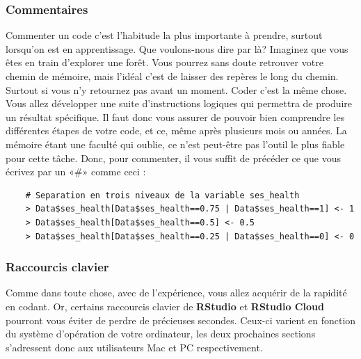 \documentclass[10.5pt,a4paper]{article}
\begin{document}
    \subsubsection{Commentaires}
    
    Commenter un code c'est l'habitude la plus importante à prendre, surtout lorsqu'on est en apprentissage. Que voulons-nous dire par là? Imaginez que vous êtes en train d'explorer une forêt. Vous pourrez sans doute retrouver votre chemin de mémoire, mais l'idéal c'est de laisser des repères le long du chemin. Surtout si vous n'y retournez pas avant un moment. Coder c'est la même chose. Vous allez développer une suite d'instructions logiques qui permettra de produire un résultat spécifique. Il faut donc vous assurer de pouvoir bien comprendre les différentes étapes de votre code, et ce, même après plusieurs mois ou années. La mémoire étant une faculté qui oublie, ce n'est peut-être pas l'outil le plus fiable pour cette tâche. Donc, pour commenter, il vous suffit de précéder ce que vous écrivez par un «$\#$» comme ceci :
    
    \begin{lstlisting}
    # Separation en trois niveaux de la variable ses_health
    > Data$ses_health[Data$ses_health==0.75 | Data$ses_health==1] <- 1 
    > Data$ses_health[Data$ses_health==0.5] <- 0.5
    > Data$ses_health[Data$ses_health==0.25 | Data$ses_health==0] <- 0
    \end{lstlisting}
    
    \subsubsection{Raccourcis clavier}
    
    Comme dans toute chose, avec de l'expérience, vous allez acquérir de la rapidité en codant. Or, certains raccourcis clavier de \textbf{RStudio} et \textbf{RStudio Cloud} pourront vous éviter de perdre de précieuses secondes. Ceux-ci varient en fonction du système d'opération de votre ordinateur, les deux prochaines sections s'adressent donc aux utilisateurs Mac et PC respectivement. 
    
\end{document}
